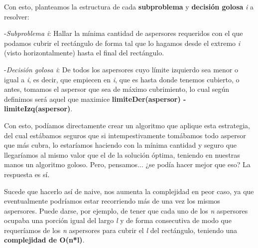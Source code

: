 Con esto, planteamos la estructura de cada \textbf{subproblema} y \textbf{decisión golosa} \textit{i} a resolver: \newline

-\textit{Subproblema i}: Hallar la mínima cantidad de aspersores requeridos con el que podamos cubrir el  rectángulo de forma tal que lo hagamos desde el extremo \textit{i} (visto horizontalmente) hasta el final del rectángulo.\newline

-\textit{Decisión golosa i}: De todos los aspersores cuyo límite izquierdo sea menor o igual a \textit{i}, es decir, que empiecen en \textit{i}, que es hasta donde tenemos cubierto, o antes, tomamos el aspersor que sea de máximo cubrimiento, lo cual según definimos será aquel que maximice \textbf{limiteDer(aspersor) - limiteIzq(aspersor)}. \newline

Con esto, podíamos directamente crear un algoritmo que aplique esta estrategia, del cual estábamos seguros que si intempestivamente tomábamos todo aspersor que más cubra, lo estaríamos haciendo con la mínima cantidad y seguro que llegaríamos al mismo valor que el de la solución óptima, teniendo en nuestras manos un algoritmo goloso. Pero, pensamos... ¿se podía hacer mejor que eso? La respuesta es sí. \newline

Sucede que hacerlo así de naive, nos aumenta la complejidad en peor caso, ya que eventualmente podríamos estar recorriendo más de una vez los mismos aspersores. Puede darse, por ejemplo, de tener que cada uno de los \textit{n} aspersores ocupaba una porción igual del largo \textit{l} y de forma consecutiva de modo que requeríamos de los \textit{n} aspersores para cubrir el \textit{l} del rectángulo, teniendo una \textbf{complejidad de O(n*l)}. \newline

